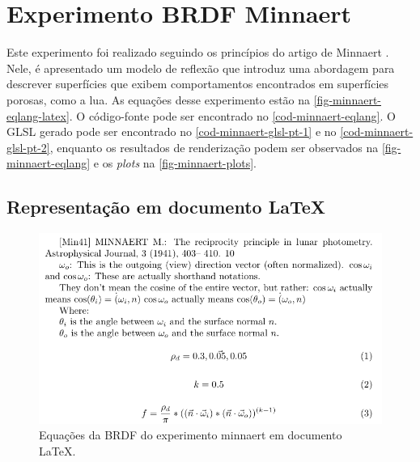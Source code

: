 \section{Experimento BRDF Minnaert}

Este experimento foi realizado seguindo os princípios do artigo de Minnaert \cite{minnaert1941reciprocity}. Nele, é apresentado um modelo de reflexão que introduz uma abordagem para descrever superfícies que exibem comportamentos encontrados em superfícies porosas, como a lua. As equações desse experimento estão na \autoref{fig-minnaert-eqlang-latex}. O código-fonte pode ser encontrado no \autoref{cod-minnaert-eqlang}. O GLSL gerado pode ser encontrado no \autoref{cod-minnaert-glsl-pt-1} e no \autoref{cod-minnaert-glsl-pt-2}, enquanto os resultados de renderização podem ser observados na \autoref{fig-minnaert-eqlang} e os \textit{plots} na \autoref{fig-minnaert-plots}.


\subsection{Representação em documento \LaTeX{}}
\begin{figure}[H]
    \caption{\label{fig-minnaert-eqlang-latex} \small Equações da BRDF do experimento minnaert em documento \LaTeX{}.}
    \begin{center}
        \includegraphics[scale=0.92]{./Imagens/brdfs/minnaert.pdf}
    \end{center}
\end{figure}

